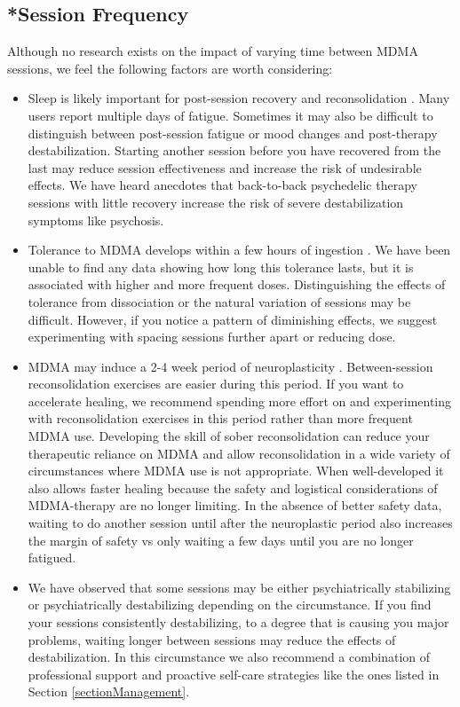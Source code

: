 \documentclass[12pt,letterpaper]{article}
\begin{document}
\subsection{*Session Frequency}
Although no research exists on the impact of varying time between MDMA sessions, we feel the following factors are worth considering:
\begin{itemize}
    \item Sleep is likely important for post-session recovery and reconsolidation \cite{simon2020sleep}. Many users report multiple days of fatigue. Sometimes it may also be difficult to distinguish between post-session fatigue or mood changes and post-therapy destabilization. Starting another session before you have recovered from the last may reduce session effectiveness and increase the risk of undesirable effects. We have heard anecdotes that back-to-back psychedelic therapy sessions with little recovery increase the risk of severe destabilization symptoms like psychosis.  
    \item Tolerance to MDMA develops within a few hours of ingestion \cite{farreTolerance,parrottTolerance}. We have been unable to find any data showing how long this tolerance lasts, but it is associated with higher and more frequent doses. Distinguishing the effects of tolerance from dissociation or the natural variation of sessions may be difficult. However, if you notice a pattern of diminishing effects, we suggest experimenting with spacing sessions further apart or reducing dose.
    \item MDMA may induce a 2-4 week period of neuroplasticity \cite{nardouMDMAPlasticity}. Between-session reconsolidation exercises are easier during this period. If you want to accelerate healing, we recommend spending more effort on and experimenting with reconsolidation exercises in this period rather than more frequent MDMA use. Developing the skill of sober reconsolidation can reduce your therapeutic reliance on MDMA and allow reconsolidation in a wide variety of circumstances where MDMA use is not appropriate. When well-developed it also allows faster healing because the safety and logistical considerations of MDMA-therapy are no longer limiting. In the absence of better safety data, waiting to do another session until after the neuroplastic period also increases the margin of safety vs only waiting a few days until you are no longer fatigued.
    \item We have observed that some sessions may be either psychiatrically stabilizing or psychiatrically destabilizing depending on the circumstance. If you find your sessions consistently destabilizing, to a degree that is causing you major problems, waiting longer between sessions may reduce the effects of destabilization. In this circumstance we also recommend a combination of professional support and proactive self-care strategies like the ones listed in Section \ref{sectionManagement}.

\end{itemize}
\end{document}
